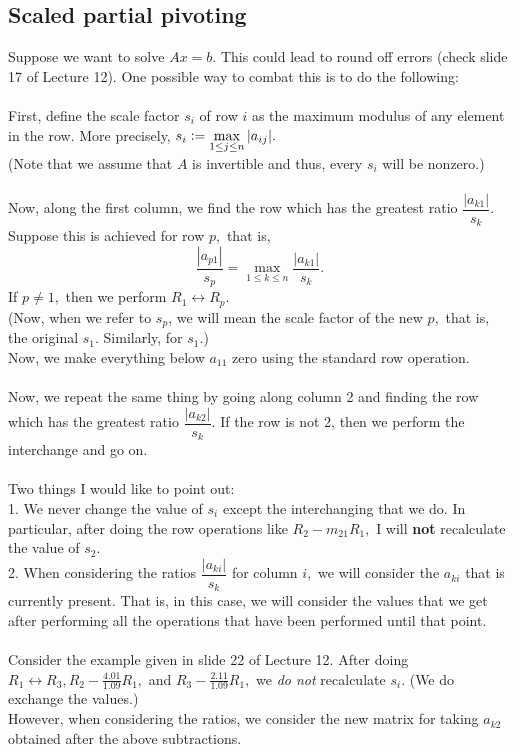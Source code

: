 \documentclass[12pt]{article}
\theoremstyle{definition}
\begin{document}
\subsection{Scaled partial pivoting}
Suppose we want to solve $Ax = b.$ This could lead to round off errors (check slide 17 of Lecture 12). One possible way to combat this is to do the following:\\~\\
First, define the scale factor $s_i$ of row $i$ as the maximum modulus of any element in the row. More precisely, $s_i \vcentcolon= \displaystyle\max_{1 \le j \le n} |a_{ij}|.$\\
(Note that we assume that $A$ is invertible and thus, every $s_i$ will be nonzero.)\\~\\
Now, along the first column, we find the row which has the greatest ratio $\dfrac{|a_{k1}|}{s_k}.$ Suppose this is achieved for row $p,$ that is,
\[\frac{|a_{p1}|}{s_p} = \max_{1 \le k \le n}\frac{|a_{k1}|}{s_k}.\]
If $p \neq 1,$ then we perform $R_1 \leftrightarrow R_p.$\\
(Now, when we refer to $s_p$, we will mean the scale factor of the new $p,$ that is, the original $s_1.$ Similarly, for $s_1.$)\\
Now, we make everything below $a_{11}$ zero using the standard row operation.\\~\\
Now, we repeat the same thing by going along column 2 and finding the row which has the greatest ratio $\dfrac{|a_{k2}|}{s_k}.$ If the row is not 2, then we perform the interchange and go on.\\~\\
Two things I would like to point out:\\
1. We never change the value of $s_i$ except the interchanging that we do. In particular, after doing the row operations like $R_2 - m_{21}R_1,$ I will \textbf{not} recalculate the value of $s_2.$\\
2. When considering the ratios $\dfrac{|a_{ki}|}{s_k}$ for column $i,$ we will consider the $a_{ki}$ that is currently present. That is, in this case, we will consider the values that we get after performing all the operations that have been performed until that point.\\~\\
Consider the example given in slide 22 of Lecture 12. After doing $R_1 \leftrightarrow R_3, R_2 - \frac{4.01}{1.09}R_1,$ and $R_3 - \frac{2.11}{1.09}R_1,$ we \emph{do not} recalculate $s_i.$ (We do exchange the values.)\\
However, when considering the ratios, we consider the new matrix for taking $a_{k2}$ obtained after the above subtractions.
\end{document}

